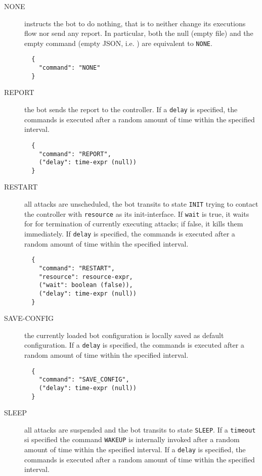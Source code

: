 \begin{description}
  \item[NONE] instructs the bot to do nothing, that is to neither change its executions flow nor send any report. In particular, both the null (empty file) and the empty command (empty JSON, i.e. {}) are equivalent to \texttt{NONE}.

  \begin{verbatim}
  {
    "command": "NONE"
  }
  \end{verbatim}

  \item[REPORT] the bot sends the report to the controller.
  If a \texttt{delay} is specified, the commands is executed after a random amount of time within the specified interval.

  \begin{verbatim}
  {
    "command": "REPORT",
    ("delay": time-expr (null))
  }
  \end{verbatim}

  \item[RESTART] all attacks are unscheduled, the bot transits to state \texttt{INIT} trying to contact the controller with \texttt{resource} as its init-interface.
  If \texttt{wait} is true, it waits for for termination of currently executing attacks; if false, it kills them immediately.
  If \texttt{delay} is specified, the commands is executed after a random amount of time within the specified interval.

  \begin{verbatim}
  {
    "command": "RESTART",
    "resource": resource-expr,
    ("wait": boolean (false)),
    ("delay": time-expr (null))
  }
  \end{verbatim}

  \item[SAVE-CONFIG] the currently loaded bot configuration is locally saved as default configuration.
  If a \texttt{delay} is specified, the commands is executed after a random amount of time within the specified interval.

  \begin{verbatim}
  {
    "command": "SAVE_CONFIG",
    ("delay": time-expr (null))
  }
  \end{verbatim}

  \item[SLEEP] all attacks are suspended and the bot transits to state \texttt{SLEEP}. If a \texttt{timeout} si specified the command \texttt{WAKEUP} is internally invoked after a random amount of time within the specified interval.
  If a \texttt{delay} is specified, the commands is executed after a random amount of time within the specified interval.


\end{description}

